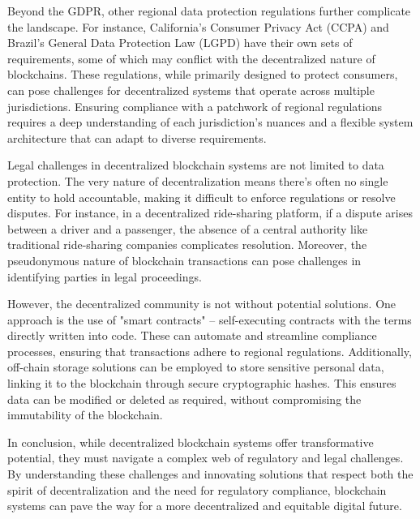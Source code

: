 Beyond the GDPR, other regional data protection regulations further complicate the landscape. For instance, California's Consumer Privacy Act (CCPA) and Brazil's General Data Protection Law (LGPD) have their own sets of requirements, some of which may conflict with the decentralized nature of blockchains. These regulations, while primarily designed to protect consumers, can pose challenges for decentralized systems that operate across multiple jurisdictions. Ensuring compliance with a patchwork of regional regulations requires a deep understanding of each jurisdiction's nuances and a flexible system architecture that can adapt to diverse requirements.

Legal challenges in decentralized blockchain systems are not limited to data protection. The very nature of decentralization means there's often no single entity to hold accountable, making it difficult to enforce regulations or resolve disputes. For instance, in a decentralized ride-sharing platform, if a dispute arises between a driver and a passenger, the absence of a central authority like traditional ride-sharing companies complicates resolution. Moreover, the pseudonymous nature of blockchain transactions can pose challenges in identifying parties in legal proceedings.

However, the decentralized community is not without potential solutions. One approach is the use of "smart contracts" – self-executing contracts with the terms directly written into code. These can automate and streamline compliance processes, ensuring that transactions adhere to regional regulations. Additionally, off-chain storage solutions can be employed to store sensitive personal data, linking it to the blockchain through secure cryptographic hashes. This ensures data can be modified or deleted as required, without compromising the immutability of the blockchain.

In conclusion, while decentralized blockchain systems offer transformative potential, they must navigate a complex web of regulatory and legal challenges. By understanding these challenges and innovating solutions that respect both the spirit of decentralization and the need for regulatory compliance, blockchain systems can pave the way for a more decentralized and equitable digital future.
